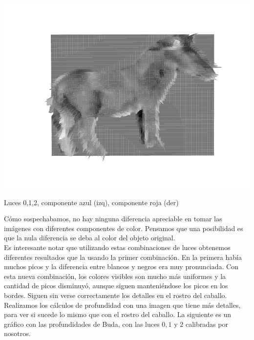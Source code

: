 {    %
    \includegraphics[scale=0.54]{informe/imagenes/profundidades/profCaballo012ColorRojo.pdf}
}
\begin{center}
    Luces 0,1,2, componente azul (izq), componente roja (der)
\end{center}

Cómo sospechabamos, no hay ninguna diferencia apreciable en tomar las imágenes con diferentes componentes de color. Pensamos que una posibilidad es que la nula diferencia se deba al color del objeto original. \\

Es interesante notar que utilizando estas combinaciones de luces obtenemos diferentes resultados que la usando la primer combinación. En la primera había muchos picos y la diferencia entre blancos y negros era muy pronunciada. Con esta nueva combinación, los colores visibles son mucho más uniformes y la cantidad de picos disminuyó, aunque siguen manteniéndose los picos en los bordes. Siguen sin verse correctamente los detalles en el rostro del caballo. \\

Realizamos los cálculos de profundidad con una imagen que tiene más detalles, para ver si sucede lo mismo que con el rostro del caballo. La siguiente es un gráfico con las profundidades de Buda, con las luces $0, 1$ y $2$ calibradas por nosotros.

